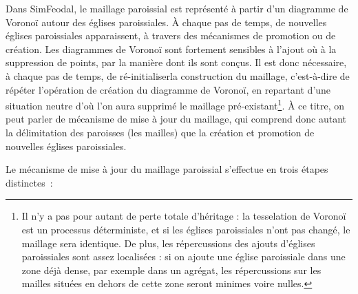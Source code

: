 \begin{tcolorbox}[breakable,left=0pt,right=0pt,top=0pt,bottom=0pt,
	colback=gray!15,colframe=gray!15,width=\dimexpr\textwidth\relax, 
	enlarge left by=0mm, boxsep=5pt,arc=0pt,outer arc=0pt]
	Dans SimFeodal, le maillage paroissial est représenté à partir d'un diagramme de Voronoï autour des églises paroissiales.
	À chaque pas de temps, de nouvelles églises paroissiales apparaissent, à travers des mécanismes de promotion ou de création.
	Les diagrammes de Voronoï sont fortement sensibles à l'ajout où à la suppression de points, par la manière dont ils sont conçus.
	Il est donc nécessaire, à chaque pas de temps, de ré-initialiserla construction du maillage, c'est-à-dire de répéter l'opération de création du diagramme de Voronoï, en repartant d'une situation \og neutre\fg{} d'où l'on aura supprimé le maillage pré-existant\footnote{
		Il n'y a pas pour autant de perte totale d'héritage : la tesselation de Voronoï est un processus déterministe, et si les églises paroissiales n'ont pas changé, le maillage sera identique.
		De plus, les répercussions des ajouts d'églises paroissiales sont assez localisées : si on ajoute une église paroissiale dans une zone déjà dense, par exemple dans un agrégat, les répercussions sur les mailles situées en dehors de cette zone seront minimes voire nulles.
	}.
	À ce titre, on peut parler de mécanisme de \og mise à jour\fg{} du maillage, qui comprend donc autant la délimitation des paroisses (les mailles) que la création et promotion de nouvelles églises paroissiales.
\end{tcolorbox}
	Le mécanisme de mise à jour du maillage paroissial s'effectue en trois étapes distinctes~:

